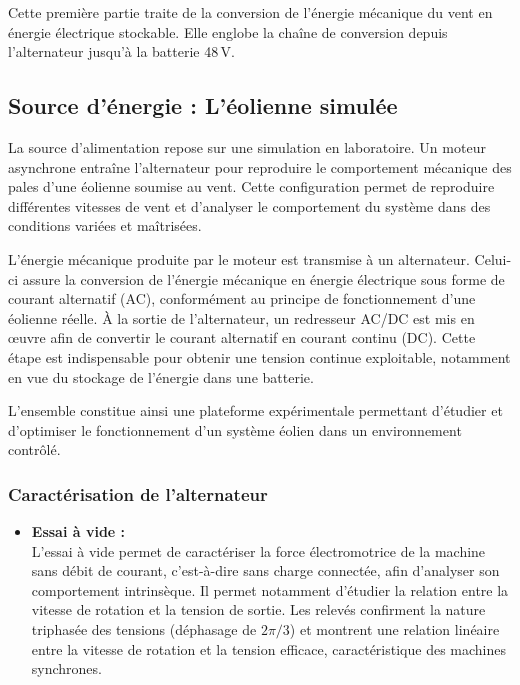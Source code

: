 Cette première partie traite de la conversion de l'énergie mécanique du vent en énergie électrique stockable. Elle englobe la chaîne de conversion depuis l'alternateur jusqu'à la batterie 48\,V.

\subsection{Source d'énergie : L'éolienne simulée}

La source d’alimentation repose sur une simulation en laboratoire. Un moteur asynchrone entraîne l’alternateur pour reproduire le comportement mécanique des pales d’une éolienne soumise au vent. Cette configuration permet de reproduire différentes vitesses de vent et d’analyser le comportement du système dans des conditions variées et maîtrisées.

L’énergie mécanique produite par le moteur est transmise à un alternateur. Celui-ci assure la conversion de l’énergie mécanique en énergie électrique sous forme de courant alternatif (AC), conformément au principe de fonctionnement d’une éolienne réelle.
À la sortie de l’alternateur, un redresseur AC/DC est mis en œuvre afin de convertir le courant alternatif en courant continu (DC). Cette étape est indispensable pour obtenir une tension continue exploitable, notamment en vue du stockage de l’énergie dans une batterie.

L’ensemble constitue ainsi une plateforme expérimentale permettant d’étudier et d’optimiser le fonctionnement d’un système éolien dans un environnement contrôlé.

\subsubsection{Caractérisation de l’alternateur}

\begin{itemize}
    \item \textbf{Essai à vide :} \\
    L'essai à vide permet de caractériser la force électromotrice de la machine sans débit de courant, c'est-à-dire sans charge connectée,  afin d’analyser son comportement intrinsèque. Il permet notamment d’étudier la relation entre la vitesse de rotation et la tension de sortie. Les relevés confirment la nature triphasée des tensions (déphasage de $2\pi/3$) et montrent une relation linéaire entre la vitesse de rotation et la tension efficace, caractéristique des machines synchrones.
\end{itemize}


